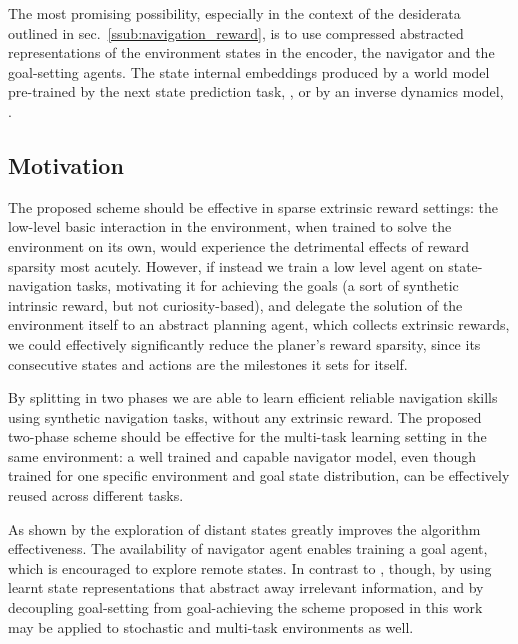 \documentclass[acmsmall, nonacm]{acmart}
\begin{document}
The most promising possibility, especially in the context of the desiderata outlined in sec.~\ref{ssub:navigation_reward}, is to use compressed abstracted representations of the environment states in the encoder, the navigator and the goal-setting agents. The state internal embeddings produced by a world model pre-trained by the next state prediction task, \citep{ha_recurrent_2018}, or by an inverse dynamics model, \citep{badia_never_2020}.


\subsection{Motivation}

The proposed scheme should be effective in sparse extrinsic reward settings: the low-level basic interaction in the environment, when trained to solve the environment on its own, would experience the detrimental effects of reward sparsity most acutely. However, if instead we train a low level agent on state-navigation tasks, motivating it for achieving the goals (a sort of synthetic intrinsic reward, but not curiosity-based), and delegate the solution of the environment itself to an abstract planning agent, which collects extrinsic rewards, we could effectively significantly reduce the planer's reward sparsity, since its consecutive states and actions are the milestones it sets for itself.

By splitting in two phases we are able to learn efficient reliable navigation skills using synthetic navigation tasks, 
without any extrinsic reward.
%
The proposed two-phase scheme should be effective for the multi-task learning setting in the same environment: a well trained and capable navigator model, even though trained for one specific environment and goal state distribution, can be effectively reused across different tasks.

As shown by \citet{ecoffet_first_2021} the exploration of distant states greatly improves the algorithm effectiveness. The availability of navigator agent enables training a goal agent, which is encouraged to explore remote states.
%
In contrast to \citep{ecoffet_first_2021}, though, by using learnt state representations that abstract away irrelevant information, and by decoupling goal-setting from goal-achieving the scheme proposed in this work may be applied to stochastic and multi-task environments as well.
\end{document}
